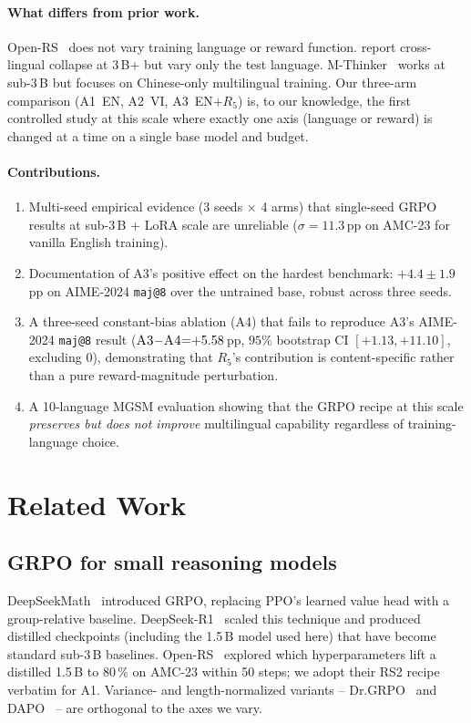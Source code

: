 \documentclass[11pt]{article}
\newcommand{\armA}{\textsc{A1}}
\newcommand{\armB}{\textsc{A2}}
\newcommand{\armC}{\textsc{A3}}
\newcommand{\armD}{\textsc{A4}}
\begin{document}
\paragraph{What differs from prior work.}
Open-RS~\cite{openRS_2025} does not vary training language or reward function.
\citet{xlingual_collapse_2025} report cross-lingual collapse at $3$\,B+ but
vary only the test language. M-Thinker~\cite{mthinker_2025} works at sub-3\,B
but focuses on Chinese-only multilingual training. Our three-arm
comparison (\armA{}~EN, \armB{}~VI, \armC{}~EN${+}R_5$) is, to our
knowledge, the first controlled study at this scale where exactly one
axis (language or reward) is changed at a time on a single base model and
budget.

\paragraph{Contributions.}
\begin{enumerate}\itemsep0pt
\item Multi-seed empirical evidence (3 seeds $\times$ 4 arms) that
single-seed GRPO results at sub-3\,B + LoRA scale are unreliable
($\sigma{=}11.3$\,pp on AMC-23 for vanilla English training).
\item Documentation of \armC{}'s positive effect on the hardest
benchmark: $+4.4 \pm 1.9$\,pp on AIME-2024 \texttt{maj@8} over the
untrained base, robust across three seeds.
\item A three-seed constant-bias ablation (\armD{}) that fails to
reproduce \armC{}'s AIME-2024 \texttt{maj@8} result
($\armC{}{-}\armD{}{=}{+}5.58$\,pp, $95\%$ bootstrap CI
$[+1.13, +11.10]$, excluding $0$), demonstrating that $R_5$'s
contribution is content-specific rather than a pure reward-magnitude
perturbation.
\item A 10-language MGSM evaluation showing that the GRPO recipe at
this scale \emph{preserves but does not improve} multilingual capability
regardless of training-language choice.
\end{enumerate}

\section{Related Work}
\label{sec:related}

\subsection{GRPO for small reasoning models}
DeepSeekMath~\cite{deepseekmath_2024} introduced GRPO, replacing PPO's
learned value head with a group-relative baseline. DeepSeek-R1~\cite{deepseekR1_2025}
scaled this technique and produced distilled checkpoints (including the
1.5\,B model used here) that have become standard sub-3\,B baselines.
Open-RS~\cite{openRS_2025} explored which hyperparameters lift a
distilled 1.5\,B to $80$\,\% on AMC-23 within 50 steps; we adopt their
RS2 recipe verbatim for \armA{}. Variance- and length-normalized
variants -- Dr.GRPO~\cite{drgrpo_2025} and DAPO~\cite{dapo_2025} --
are orthogonal to the axes we vary.
\end{document}
